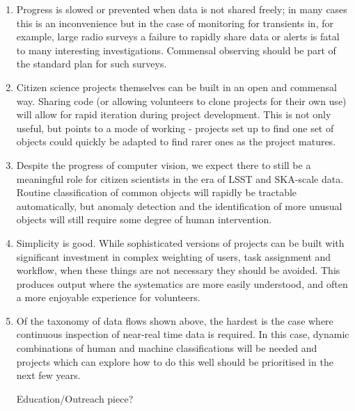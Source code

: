 \begin{enumerate}

\item Progress is slowed or prevented when data is not shared freely; in many cases this is an inconvenience but in the case of monitoring for transients in, for example, large radio surveys a failure to rapidly share data or alerts is fatal to many interesting investigations. Commensal observing should be part of the standard plan for such surveys.

\item Citizen science projects themselves can be built in an open and commensal way. Sharing code (or allowing volunteers to clone projects for their own use) will allow for rapid iteration during project development. This is not only useful, but points to a mode of working - projects set up to find one set of objects could quickly be adapted to find rarer ones as the project matures. 

\item Despite the progress of computer vision, we expect there to still be a meaningful role for citizen scientists in the era of LSST and SKA-scale data. Routine classification of common objects will rapidly be tractable automatically, but anomaly detection and the identification of more unusual objects will still require some degree of human intervention. 

\item Simplicity is good. While sophisticated versions of projects can be built with significant investment in complex weighting of users, task assignment and workflow, when these things are not necessary they should be avoided. This produces output where the systematics are more easily understood, and often a more enjoyable experience for volunteers. 

\item Of the taxonomy of data flows shown above, the hardest is the case where continuous inspection of near-real time data is required. In this case, dynamic combinations of human and machine classifications will be needed and projects which can explore how to do this well should be prioritised in the next few years.

\item [Education/Outreach piece?]

\end{enumerate}